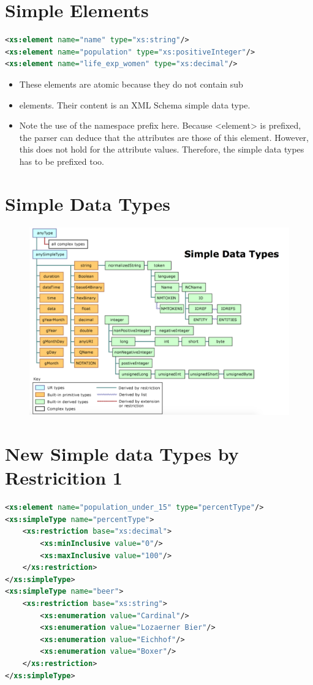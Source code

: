 \section{Simple Elements}
\begin{lstlisting}[language=XML, caption={Simple Elements}]
<xs:element name="name" type="xs:string"/>
<xs:element name="population" type="xs:positiveInteger"/>
<xs:element name="life_exp_women" type="xs:decimal"/>
\end{lstlisting}
\begin{itemize}
\item These elements are atomic because they do not contain sub\item elements. Their content is an XML Schema simple data type.
\item Note the use of the namespace prefix here. Because <element> is prefixed, the parser can deduce that the attributes are those of
this element. However, this does not hold for the attribute values. Therefore, the simple data types has to be prefixed too.
\end{itemize}

\section{Simple Data Types}
\begin{figure}[h!]
\includegraphics[width=\textwidth]{fig/SimpleDataTypes.png}
\end{figure}

\section{New Simple data Types by Restricition 1}
\begin{lstlisting}[language=XML, caption={Simple Elements}]
<xs:element name="population_under_15" type="percentType"/>
<xs:simpleType name="percentType"> 
	<xs:restriction base="xs:decimal">
		<xs:minInclusive value="0"/>
		<xs:maxInclusive value="100"/>
	</xs:restriction>
</xs:simpleType>
<xs:simpleType name="beer"> 
	<xs:restriction base="xs:string">
		<xs:enumeration value="Cardinal"/> 
		<xs:enumeration value="Lozaerner Bier"/> 
		<xs:enumeration value="Eichhof"/> 
		<xs:enumeration value="Boxer"/>
	</xs:restriction> 
</xs:simpleType>
\end{lstlisting}

